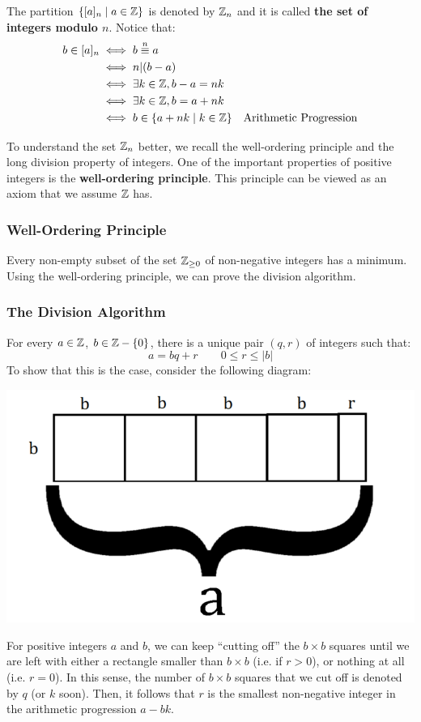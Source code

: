 \documentclass[letterpaper]{article}
\begin{document}
The partition $\{[a]_n \mid a \in \mathbb{Z}\}$ is denoted by $\mathbb{Z}_n$ and it is called \textbf{the set of integers modulo $n$}. Notice that:
\begin{equation*}
    \begin{aligned}
        b \in [a]_n &\iff b \overset{n}{\equiv} a \\ 
            &\iff n | (b - a) \\ 
            &\iff \exists k \in \mathbb{Z}, b - a = nk \\ 
            &\iff \exists k \in \mathbb{Z}, b = a + nk \\ 
            &\iff b \in \{a + nk \mid k \in \mathbb{Z}\} & \text{Arithmetic Progression}
    \end{aligned}
\end{equation*} 

To understand the set $\mathbb{Z}_n$ better, we recall the well-ordering principle and the long division property of integers. One of the important properties of positive integers is the \textbf{well-ordering principle}. This principle can be viewed as an axiom that we assume $\mathbb{Z}$ has. 

\subsubsection{Well-Ordering Principle}
Every non-empty subset of the set $\mathbb{Z}_{\geq 0}$ of non-negative integers has a minimum. Using the well-ordering principle, we can prove the division algorithm. 

\subsubsection{The Division Algorithm}
For every $a \in \mathbb{Z}$, $b \in \mathbb{Z} - \{0\}$, there is a unique pair $(q, r)$ of integers such that:
\[a = bq + r \qquad 0 \leq r \leq |b|\]
To show that this is the case, consider the following diagram:
\begin{center}
    \includegraphics[scale=0.4]{img/mod_div.PNG}
\end{center}
For positive integers $a$ and $b$, we can keep ``cutting off'' the $b \times b$ squares until we are left with either a rectangle smaller than $b \times b$ (i.e. if $r > 0$), or nothing at all (i.e. $r = 0$). In this sense, the number of $b \times b$ squares that we cut off is denoted by $q$ (or $k$ soon). Then, it follows that $r$ is the smallest non-negative integer in the arithmetic progression $a - bk$.
\end{document}

